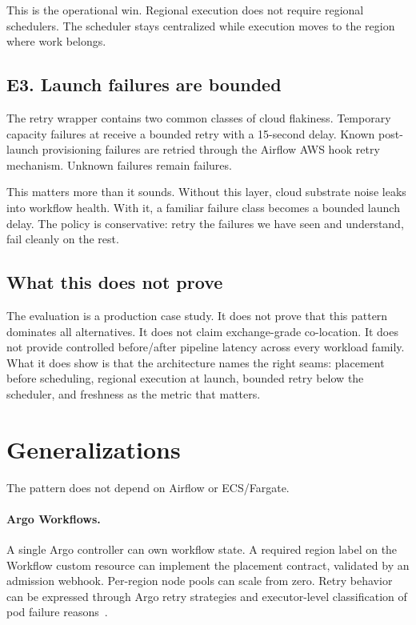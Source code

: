 \documentclass[11pt, reqno]{amsart}
\newcommand{\code}[1]{\texttt{\detokenize{#1}}}
\begin{document}
This is the operational win. Regional execution does not require regional schedulers. The scheduler stays centralized while execution moves to the region where work belongs.

\subsection{E3. Launch failures are bounded}

The retry wrapper contains two common classes of cloud flakiness. Temporary capacity failures at \code{RunTask} receive a bounded retry with a 15-second delay. Known post-launch provisioning failures are retried through the Airflow AWS hook retry mechanism. Unknown failures remain failures.

This matters more than it sounds. Without this layer, cloud substrate noise leaks into workflow health. With it, a familiar failure class becomes a bounded launch delay. The policy is conservative: retry the failures we have seen and understand, fail cleanly on the rest.

\subsection{What this does not prove}

The evaluation is a production case study. It does not prove that this pattern dominates all alternatives. It does not claim exchange-grade co-location. It does not provide controlled before/after pipeline latency across every workload family. What it does show is that the architecture names the right seams: placement before scheduling, regional execution at launch, bounded retry below the scheduler, and freshness as the metric that matters.

\section{Generalizations}
\label{sec:generalizations}

The pattern does not depend on Airflow or ECS/Fargate.

\paragraph{Argo Workflows.}
A single Argo controller can own workflow state. A required region label on the Workflow custom resource can implement the placement contract, validated by an admission webhook. Per-region node pools can scale from zero. Retry behavior can be expressed through Argo retry strategies and executor-level classification of pod failure reasons~\cite{k8s_components,k8s_hpa,k8s_cluster_autoscaling,keda_docs}.
\end{document}
